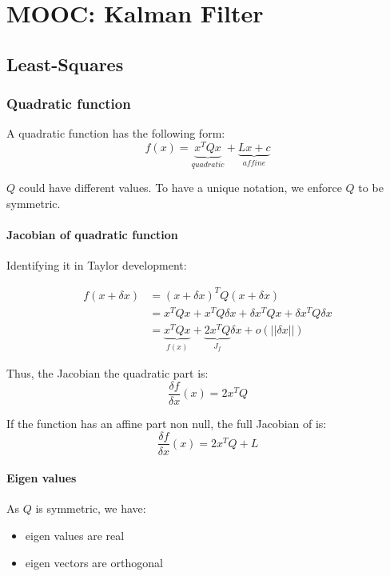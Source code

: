 
\chapter{MOOC: Kalman Filter}


\section{Least-Squares}
\subsection{Quadratic function}
A quadratic function has the following form:
\begin{equation}
    f(x) = \underbrace{x^T Q x}_{quadratic} + \underbrace{L x + c}_{affine}
\end{equation}


$Q$ could have different values. To have a unique notation, we enforce $Q$ to be symmetric.

\subsubsection{Jacobian of quadratic function}
Identifying it in Taylor development:

\begin{equation}
\begin{split}
    f(x + \delta x) &= (x+\delta x)^T Q (x + \delta x) \\
    &= x^T Q x + x^T Q \delta x + \delta x^T Q x + \delta x^T Q \delta x \\
    &= \underbrace{x^T Q x}_{f(x)} + \underbrace{2 x^T Q}_{J_f}  \delta x + o(||\delta x||)
\end{split}
\end{equation}

Thus, the Jacobian the quadratic part is:
\begin{equation}
    \frac{\delta f}{\delta x}(x) = 2 x^T Q
\end{equation}

If the function has an affine part non null, the full Jacobian of is:
\begin{equation}
    \frac{\delta f}{\delta x}(x) = 2 x^T Q + L
\end{equation}



\subsubsection{Eigen values}
As $Q$ is symmetric, we have:
\begin{itemize}
    \item eigen values are real
    \item eigen vectors are orthogonal
\end{itemize}

